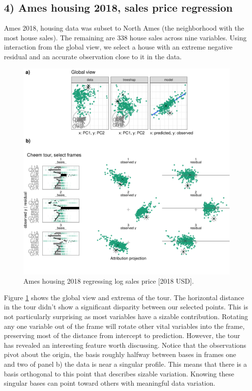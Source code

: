 \documentclass[
  article]{article}
\begin{document}
\hypertarget{ames-housing-2018-sales-price-regression}{%
\subsection{4) Ames housing 2018, sales price regression}\label{ames-housing-2018-sales-price-regression}}

Ames 2018, housing data was subset to North Ames (the neighborhood with the most house sales). The remaining are 338 house sales across nine variables. Using interaction from the global view, we select a house with an extreme negative residual and an accurate observation close to it in the data.

\begin{figure}

{\centering \includegraphics[width=1\linewidth]{./figures/case_ames2018} 

}

\caption{Ames housing 2018 regressing log sales price [2018 USD].}\label{fig:caseames}
\end{figure}

Figure \ref{fig:caseames} shows the global view and extrema of the tour. The horizontal distance in the tour didn't show a significant disparity between our selected points. This is not particularly surprising as most variables have a sizable contribution. Rotating any one variable out of the frame will rotate other vital variables into the frame, preserving most of the distance from intercept to prediction. However, the tour has revealed an interesting feature worth discussing. Notice that the observations pivot about the origin, the basis roughly halfway between bases in frames one and two of panel b) the data is near a singular profile. This means that there is a basis orthogonal to this point that describes sizable variation. Knowing these singular bases can
point toward others with meaningful data variation.
\end{document}
